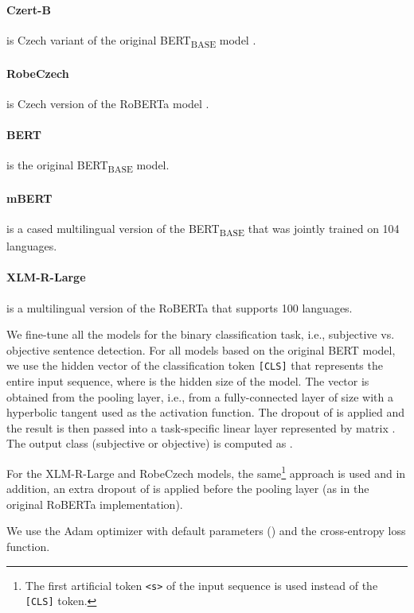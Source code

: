\documentclass[10pt, a4paper]{article}
\begin{document}
\paragraph{Czert-B} \cite{czert} is Czech variant of  the original BERT\textsubscript{BASE} model \cite{devlin-etal-2019-bert}.

\paragraph{RobeCzech} \cite{straka2021robeczech} is Czech version of the RoBERTa model \cite{liu2019roberta}.

\paragraph{BERT} \cite{devlin-etal-2019-bert} is the original BERT\textsubscript{BASE} model.

\paragraph{mBERT} \cite{devlin-etal-2019-bert} is a cased multilingual version of the BERT\textsubscript{BASE} that was jointly trained on 104 languages. 

\paragraph{XLM-R-Large} \cite{xlm-r} is a multilingual version of the RoBERTa \cite{liu2019roberta} that supports 100 languages.

We fine-tune all the models for the binary classification task, i.e., subjective vs. objective sentence detection. For all models based on the original BERT model, we use the hidden vector  of the classification token \texttt{[CLS]} that represents the entire input sequence, where  is the hidden size of the model. The vector is obtained from the pooling layer, i.e., from a fully-connected layer of size  with a hyperbolic tangent used as the activation function. The dropout of  is  applied and the result is then passed into a task-specific linear layer represented by matrix . The output class  (subjective or objective) is computed as
.

\par For the XLM-R-Large and RobeCzech models, the same\footnote{The first artificial token \texttt{<s>} of the input sequence is used instead of the \texttt{[CLS]} token.} approach is used and in addition, an extra dropout of  is applied before the pooling layer (as in the original RoBERTa implementation).
\par We use the Adam \cite{Kingma-adam} optimizer with default parameters () and the cross-entropy loss function.
\end{document}
